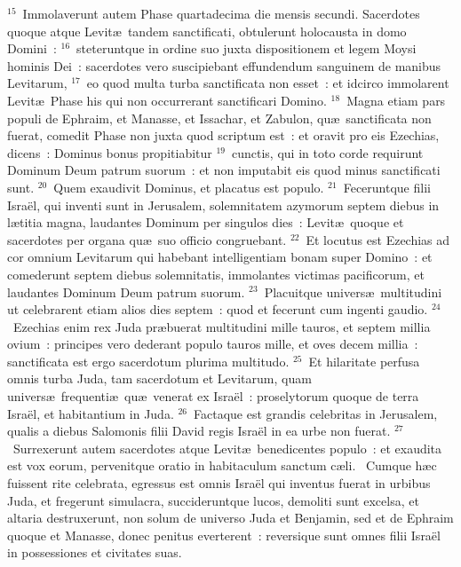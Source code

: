 ${}^{15}$~Immolaverunt autem Phase quartadecima die mensis secundi. Sacerdotes quoque atque Levit\ae\ tandem sanctificati, obtulerunt holocausta in domo Domini~:
${}^{16}$~steteruntque in ordine suo juxta dispositionem et legem Moysi hominis Dei~: sacerdotes vero suscipiebant effundendum sanguinem de manibus Levitarum,
${}^{17}$~eo quod multa turba sanctificata non esset~: et idcirco immolarent Levit\ae\ Phase his qui non occurrerant sanctificari Domino.
${}^{18}$~Magna etiam pars populi de Ephraim, et Manasse, et Issachar, et Zabulon, qu\ae\ sanctificata non fuerat, comedit Phase non juxta quod scriptum est~: et oravit pro eis Ezechias, dicens~: Dominus bonus propitiabitur
${}^{19}$~cunctis, qui in toto corde requirunt Dominum Deum patrum suorum~: et non imputabit eis quod minus sanctificati sunt.
${}^{20}$~Quem exaudivit Dominus, et placatus est populo.
${}^{21}$~Feceruntque filii Isra\"el, qui inventi sunt in Jerusalem, solemnitatem azymorum septem diebus in l\ae titia magna, laudantes Dominum per singulos dies~: Levit\ae\ quoque et sacerdotes per organa qu\ae\ suo officio congruebant.
${}^{22}$~Et locutus est Ezechias ad cor omnium Levitarum qui habebant intelligentiam bonam super Domino~: et comederunt septem diebus solemnitatis, immolantes victimas pacificorum, et laudantes Dominum Deum patrum suorum.
${}^{23}$~Placuitque univers\ae\ multitudini ut celebrarent etiam alios dies septem~: quod et fecerunt cum ingenti gaudio.
${}^{24}$~Ezechias enim rex Juda pr\ae buerat multitudini mille tauros, et septem millia ovium~: principes vero dederant populo tauros mille, et oves decem millia~: sanctificata est ergo sacerdotum plurima multitudo.
${}^{25}$~Et hilaritate perfusa omnis turba Juda, tam sacerdotum et Levitarum, quam univers\ae\ frequenti\ae\ qu\ae\ venerat ex Isra\"el~: proselytorum quoque de terra Isra\"el, et habitantium in Juda.
${}^{26}$~Factaque est grandis celebritas in Jerusalem, qualis a diebus Salomonis filii David regis Isra\"el in ea urbe non fuerat.
${}^{27}$~Surrexerunt autem sacerdotes atque Levit\ae\ benedicentes populo~: et exaudita est vox eorum, pervenitque oratio in habitaculum sanctum c\ae li.
~\lettrine[lines=10,image=true,loversize=0.05,lraise=-0.03]{C}{}umque h\ae c fuissent rite celebrata, egressus est omnis Isra\"el qui inventus fuerat in urbibus Juda, et fregerunt simulacra, succideruntque lucos, demoliti sunt excelsa, et altaria destruxerunt, non solum de universo Juda et Benjamin, sed et de Ephraim quoque et Manasse, donec penitus everterent~: reversique sunt omnes filii Isra\"el in possessiones et civitates suas.

